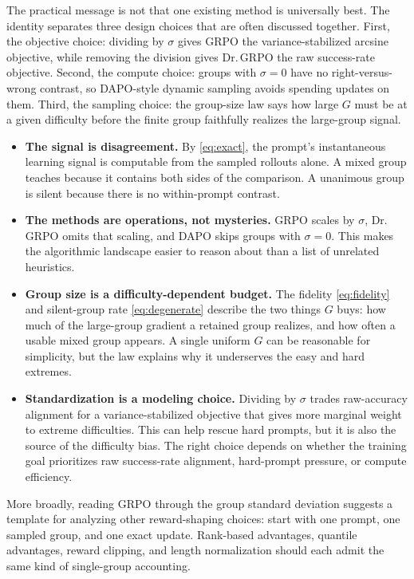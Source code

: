 \documentclass[11pt]{article}
\theoremstyle{plain}
\theoremstyle{definition}
\begin{document}
The practical message is not that one existing method is universally best. The identity separates three design choices that are often discussed together. First, the objective choice: dividing by $\sigma$ gives GRPO the variance-stabilized arcsine objective, while removing the division gives Dr.\,GRPO the raw success-rate objective. Second, the compute choice: groups with $\sigma=0$ have no right-versus-wrong contrast, so DAPO-style dynamic sampling avoids spending updates on them. Third, the sampling choice: the group-size law says how large $G$ must be at a given difficulty before the finite group faithfully realizes the large-group signal.

\begin{itemize}
\item \textbf{The signal is disagreement.} By \eqref{eq:exact}, the prompt's instantaneous learning signal is computable from the sampled rollouts alone. A mixed group teaches because it contains both sides of the comparison. A unanimous group is silent because there is no within-prompt contrast.
\item \textbf{The methods are operations, not mysteries.} GRPO scales by $\sigma$, Dr.\,GRPO omits that scaling, and DAPO skips groups with $\sigma=0$. This makes the algorithmic landscape easier to reason about than a list of unrelated heuristics.
\item \textbf{Group size is a difficulty-dependent budget.} The fidelity \eqref{eq:fidelity} and silent-group rate \eqref{eq:degenerate} describe the two things $G$ buys: how much of the large-group gradient a retained group realizes, and how often a usable mixed group appears. A single uniform $G$ can be reasonable for simplicity, but the law explains why it underserves the easy and hard extremes.
\item \textbf{Standardization is a modeling choice.} Dividing by $\sigma$ trades raw-accuracy alignment for a variance-stabilized objective that gives more marginal weight to extreme difficulties. This can help rescue hard prompts, but it is also the source of the difficulty bias. The right choice depends on whether the training goal prioritizes raw success-rate alignment, hard-prompt pressure, or compute efficiency.
\end{itemize}

More broadly, reading GRPO through the group standard deviation suggests a template for analyzing other reward-shaping choices: start with one prompt, one sampled group, and one exact update. Rank-based advantages, quantile advantages, reward clipping, and length normalization should each admit the same kind of single-group accounting.
\end{document}
